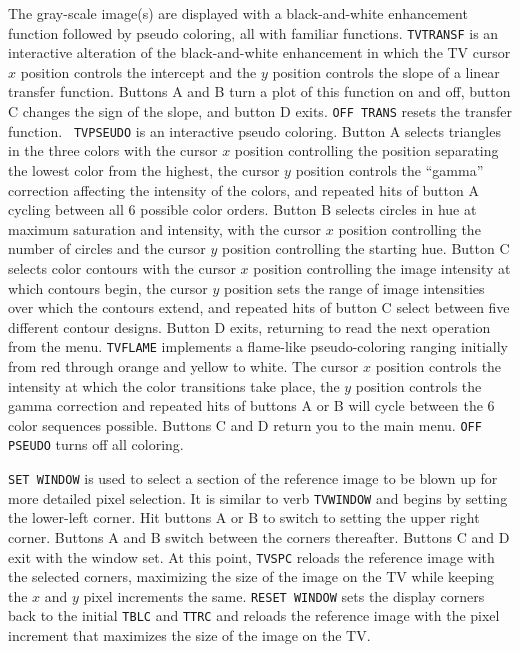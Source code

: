 \documentclass[twoside]{article}
\begin{document}
The gray-scale image(s) are displayed with a black-and-white
enhancement function followed by pseudo coloring, all with familiar
functions.  {\tt TVTRANSF} is an interactive alteration of the
black-and-white enhancement in which the TV cursor $x$ position
controls the intercept and the $y$ position controls the slope of a
linear transfer function.  Buttons A and B turn a plot of this
function on and off, button C changes the sign of the slope, and
button D exits.  {\tt OFF TRANS} resets the transfer function.  {\tt
  TVPSEUDO} is an interactive pseudo coloring.  Button A selects
triangles in the three colors with the cursor $x$ position controlling
the position separating the lowest color from the highest, the cursor
$y$ position controls the ``gamma'' correction affecting the intensity
of the colors, and repeated hits of button A cycling between all 6
possible color orders.  Button B selects circles in hue at maximum
saturation and intensity, with the cursor $x$ position controlling the
number of circles and the cursor $y$ position controlling the starting
hue.  Button C selects color contours with the cursor $x$ position
controlling the image intensity at which contours begin, the cursor
$y$ position sets the range of image intensities over which the
contours extend, and repeated hits of button C select between five
different contour designs.  Button D exits, returning to read the next
operation from the menu.  {\tt TVFLAME} implements a flame-like
pseudo-coloring ranging initially from red through orange and yellow
to white.  The cursor $x$ position controls the intensity at which the
color transitions take place, the $y$ position controls the gamma
correction and repeated hits of buttons A or B will cycle between the
6 color sequences possible.  Buttons C and D return you to the main
menu.  {\tt OFF PSEUDO} turns off all coloring.

{\tt SET WINDOW} is used to select a section of the reference image to
be blown up for more detailed pixel selection.  It is similar to verb
{\tt TVWINDOW} and begins by setting the lower-left corner.  Hit
buttons A or B to switch to setting the upper right corner.  Buttons A
and B switch between the corners thereafter.  Buttons C and D exit
with the window set.  At this point, {\tt TVSPC} reloads the
reference image with the selected corners, maximizing the size of the
image on the TV while keeping the $x$ and $y$ pixel increments the
same.  {\tt RESET WINDOW} sets the display corners back to the initial
{\tt TBLC} and {\tt TTRC} and reloads the reference image with the
pixel increment that maximizes the size of the image on the TV.
\end{document}
